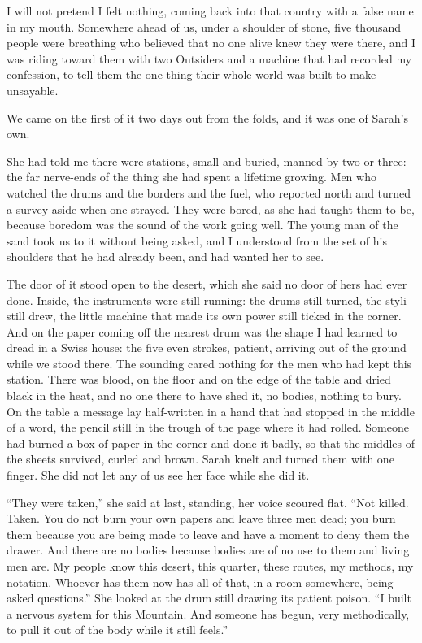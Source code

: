 I will not pretend I felt nothing, coming back into that country with a false name in my mouth. Somewhere ahead of us, under a shoulder of stone, five thousand people were breathing who believed that no one alive knew they were there, and I was riding toward them with two Outsiders and a machine that had recorded my confession, to tell them the one thing their whole world was built to make unsayable.\par

\ornament

We came on the first of it two days out from the folds, and it was one of Sarah's own.\par

She had told me there were stations, small and buried, manned by two or three: the far nerve-ends of the thing she had spent a lifetime growing. Men who watched the drums and the borders and the fuel, who reported north and turned a survey aside when one strayed. They were bored, as she had taught them to be, because boredom was the sound of the work going well. The young man of the sand took us to it without being asked, and I understood from the set of his shoulders that he had already been, and had wanted her to see.\par

The door of it stood open to the desert, which she said no door of hers had ever done. Inside, the instruments were still running: the drums still turned, the styli still drew, the little machine that made its own power still ticked in the corner. And on the paper coming off the nearest drum was the shape I had learned to dread in a Swiss house: the five even strokes, patient, arriving out of the ground while we stood there. The sounding cared nothing for the men who had kept this station. There was blood, on the floor and on the edge of the table and dried black in the heat, and no one there to have shed it, no bodies, nothing to bury. On the table a message lay half-written in a hand that had stopped in the middle of a word, the pencil still in the trough of the page where it had rolled. Someone had burned a box of paper in the corner and done it badly, so that the middles of the sheets survived, curled and brown. Sarah knelt and turned them with one finger. She did not let any of us see her face while she did it.\par

``They were taken,'' she said at last, standing, her voice scoured flat. ``Not killed. Taken. You do not burn your own papers and leave three men dead; you burn them because you are being made to leave and have a moment to deny them the drawer. And there are no bodies because bodies are of no use to them and living men are. My people know this desert, this quarter, these routes, my methods, my notation. Whoever has them now has all of that, in a room somewhere, being asked questions.'' She looked at the drum still drawing its patient poison. ``I built a nervous system for this Mountain. And someone has begun, very methodically, to pull it out of the body while it still feels.''\par

